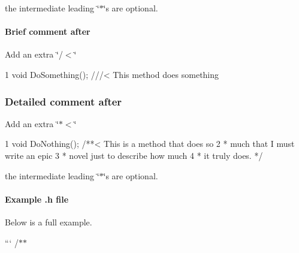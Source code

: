 \begin{DoxyItemize}
\item the intermediate leading \char`\"{}$\ast$\char`\"{}s are optional.
\end{DoxyItemize}

\paragraph*{Brief comment after}

Add an extra \char`\"{}/$<$\char`\"{}


\begin{DoxyCode}
1 void DoSomething(); ///< This method does something
\end{DoxyCode}


\subsubsection*{Detailed comment after}

Add an extra \char`\"{}$\ast$$<$\char`\"{}


\begin{DoxyCode}
1 void DoNothing(); /**< This is a method that does so
2   * much that I must write an epic 
3   * novel just to describe how much
4   * it truly does. */
\end{DoxyCode}



\begin{DoxyItemize}
\item the intermediate leading \char`\"{}$\ast$\char`\"{}s are optional.
\end{DoxyItemize}

\paragraph*{Example .h file}

Below is a full example.

``` /$\ast$$\ast$
\begin{DoxyItemize}
\item 
\end{DoxyItemize}